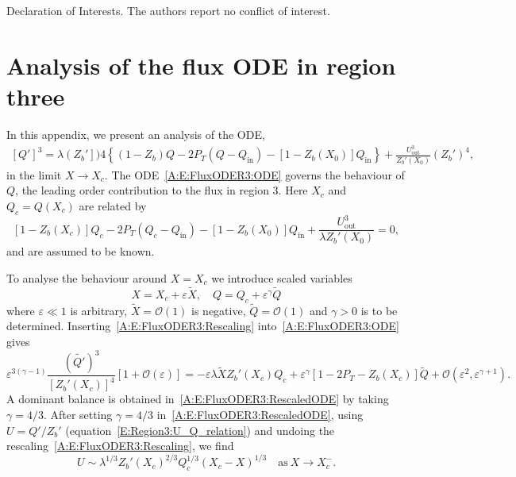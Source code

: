 \documentclass{jfm}
\newcommand{\order}[1]{\mathcal{O}(#1)}
\newcommand{\Pt}{\textit{P}_T}
\renewcommand{\in}{\text{in}} %
\newcommand{\out}{\text{out}}
\begin{document}
Declaration of Interests. The authors report no conflict of interest.

\appendix

\section{Analysis of the flux ODE in region three}\label{A:FluxODERegion3}
In this appendix, we present an analysis of the ODE,
\begin{multline}\label{A:E:FluxODER3:ODE}
\left[Q'\right]^3 =\lambda \left(Z_b'\right])4 \left\{\left(1 - Z_b\right)Q - 2\Pt\left(Q - Q_\in\right) -\left[1 - Z_b(X_0)\right]Q_\in\right\} +\frac{U_\out^3}{Z_b'(X_0)}\left(Z_b'\right)^4,
\end{multline}
in the limit $X \to X_c$. The ODE~\eqref{A:E:FluxODER3:ODE} governs the behaviour of $Q$, the leading order contribution to the flux in region 3.  Here $X_c$ and $Q_c = Q(X_c)$ are related by
\begin{equation}
\left[1 - Z_b(X_c)\right]Q_c - 2\Pt\left(Q_c - Q_\in\right) -\left[1 - Z_b(X_0)\right]Q_\in +  \frac{U_\out^3}{\lambda Z_b'(X_0)} = 0,
\end{equation}
and are assumed to be known. 

To analyse the behaviour around $X = X_c$ we introduce scaled variables
\begin{equation}\label{A:E:FluxODER3:Rescaling}
X = X_c + \varepsilon \tilde{X}, \quad Q = Q_c + \varepsilon^\gamma \tilde{Q}
\end{equation}
where $\varepsilon \ll 1$ is arbitrary, $\tilde{X} =\order{1}$ is negative, $\tilde{Q} = \order{1}$ and $\gamma >0$ is to be determined. Inserting~\eqref{A:E:FluxODER3:Rescaling} into~\eqref{A:E:FluxODER3:ODE} gives
\begin{equation}\label{A:E:FluxODER3:RescaledODE}
\varepsilon^{3(\gamma - 1)}\frac{\left(\tilde{Q'}\right)^3}{\left[Z_b'(X_c)\right]^4}\left[1 + \order{\varepsilon} \right]= -\varepsilon\lambda\tilde{X}Z_b'(X_c)Q_c + \varepsilon^\gamma \left[1 - 2\Pt - Z_b(X_c)\right] \tilde{Q} + \order{\varepsilon^2, \varepsilon^{\gamma + 1}}.
\end{equation}
A dominant balance is obtained in~\eqref{A:E:FluxODER3:RescaledODE} by taking $\gamma = 4/3$. After setting $\gamma = 4/3$ in~\eqref{A:E:FluxODER3:RescaledODE}, using $U = Q'/Z_b'$ (equation~\eqref{E:Region3:U_Q_relation}) and undoing the rescaling~\eqref{A:E:FluxODER3:Rescaling}, we find 
\begin{equation}
U \sim \lambda^{1/3}Z_b'(X_c)^{2/3}Q_c^{1/3}(X_c - X)^{1/3} \quad \text{as}~X \to X_c^-.
\end{equation}
 
\end{document}
